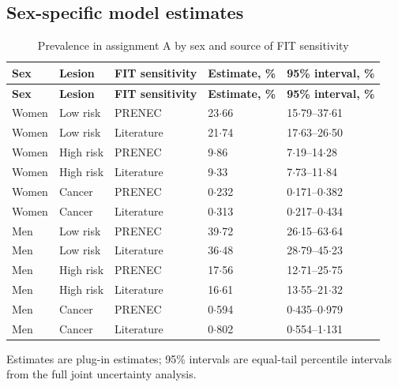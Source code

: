 \documentclass[10pt,a4paper]{article}
\newcommand{\dec}{\ensuremath{\cdot}}
\begin{document}
\subsection*{Sex-specific model estimates}

\begin{longtable}{@{}L{0.12\textwidth}L{0.14\textwidth}
L{0.16\textwidth}L{0.22\textwidth}L{0.22\textwidth}@{}}
\caption{Prevalence in assignment A by sex and source of FIT sensitivity}
\label{tab:sexresults}\\
\toprule
\textbf{Sex} & \textbf{Lesion} & \textbf{FIT sensitivity} &
\textbf{Estimate, \%} & \textbf{95\% interval, \%}\\
\midrule
\endfirsthead
\toprule
\textbf{Sex} & \textbf{Lesion} & \textbf{FIT sensitivity} &
\textbf{Estimate, \%} & \textbf{95\% interval, \%}\\
\midrule
\endhead
Women & Low risk & PRENEC & 23\dec{}66 & 15\dec{}79--37\dec{}61\\
Women & Low risk & Literature & 21\dec{}74 & 17\dec{}63--26\dec{}50\\
Women & High risk & PRENEC & 9\dec{}86 & 7\dec{}19--14\dec{}28\\
Women & High risk & Literature & 9\dec{}33 & 7\dec{}73--11\dec{}84\\
Women & Cancer & PRENEC & 0\dec{}232 & 0\dec{}171--0\dec{}382\\
Women & Cancer & Literature & 0\dec{}313 & 0\dec{}217--0\dec{}434\\
\addlinespace
Men & Low risk & PRENEC & 39\dec{}72 & 26\dec{}15--63\dec{}64\\
Men & Low risk & Literature & 36\dec{}48 & 28\dec{}79--45\dec{}23\\
Men & High risk & PRENEC & 17\dec{}56 & 12\dec{}71--25\dec{}75\\
Men & High risk & Literature & 16\dec{}61 & 13\dec{}55--21\dec{}32\\
Men & Cancer & PRENEC & 0\dec{}594 & 0\dec{}435--0\dec{}979\\
Men & Cancer & Literature & 0\dec{}802 & 0\dec{}554--1\dec{}131\\
\bottomrule
\end{longtable}

\noindent\footnotesize Estimates are plug-in estimates; 95\% intervals are
equal-tail percentile intervals from the full joint uncertainty analysis.
\normalsize
\end{document}
